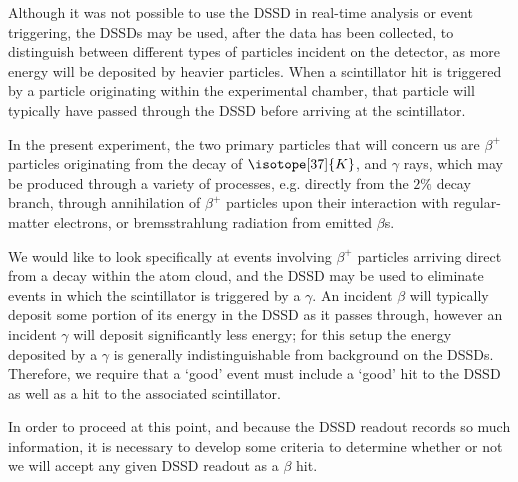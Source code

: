 

Although it was not possible to use the DSSD in real-time analysis or event triggering, the DSSDs may be used, after the data has been collected, to distinguish between different types of particles incident on the detector, as more energy will be deposited by heavier particles.  When a scintillator hit is triggered by a particle originating within the experimental chamber, that particle will typically have passed through the DSSD before arriving at the scintillator.

In the present experiment, the two primary particles that will concern us are $\beta^+$ particles originating from the decay of $\isotope[37]{K}$, and $\gamma$ rays, which may be produced through a variety of processes, e.g. directly from the $2\%$ decay branch, through annihilation of $\beta^+$ particles upon their interaction with regular-matter electrons, or bremsstrahlung radiation from emitted $\beta$s.  

We would like to look specifically at events involving $\beta^+$ particles arriving direct from a decay within the atom cloud, and the DSSD may be used to eliminate events in which the scintillator is triggered by a $\gamma$.  An incident $\beta$ will typically deposit some portion of its energy in the DSSD as it passes through, however an incident $\gamma$ will deposit significantly less energy; for this setup the energy deposited by a $\gamma$ is generally indistinguishable from background on the DSSDs.  Therefore, we require that a `good' event must include a `good' hit to the DSSD as well as a hit to the associated scintillator.   

In order to proceed at this point, and because the DSSD readout records so much information, it is necessary to develop some criteria to determine whether or not we will accept any given DSSD readout as a $\beta$ hit.




